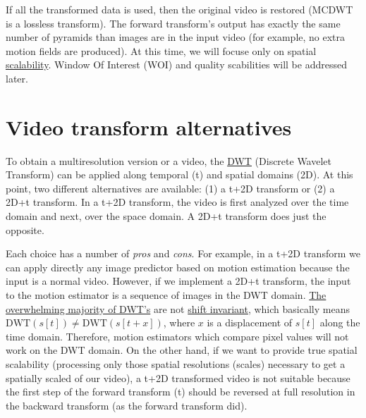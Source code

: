 If all the transformed data is used, then the original video is
restored (MCDWT is a lossless transform). The forward transform's
output has exactly the same number of pyramids than images are in the
input video (for example, no extra motion fields are produced). At
this time, we will focuse only on spatial
\href{http://inst.eecs.berkeley.edu/~ee290t/sp04/lectures/videowavelet_UCB1-3.pdf}{scalability}. Window Of Interest (WOI) and quality scabilities will be addressed later.

\section{Video transform alternatives}
To obtain a multiresolution version or a video, the
\href{https://en.wikipedia.org/wiki/Discrete_wavelet_transform}{DWT}
(Discrete Wavelet Transform) can be applied along temporal (t) and
spatial domains (2D). At this point, two different alternatives are
available: (1) a t+2D transform or (2) a 2D+t transform. In a t+2D
transform, the video is first analyzed over the time domain and next,
over the space domain. A 2D+t transform does just the opposite.

Each choice has a number of \emph{pros} and \emph{cons}. For example, in
a t+2D transform we can apply directly any image predictor based on
motion estimation because the input is a normal video. However, if we
implement a 2D+t transform, the input to the motion estimator is a
sequence of images in the DWT domain.
\href{http://www.polyvalens.com/blog/wavelets/theory}{The overwhelming
majority of DWT's} are not
\href{http://www.polyvalens.com/blog/wavelets/theory}{shift invariant},
which basically means $\text{DWT}(s[t]) \neq \text{DWT}(s[t+x])$,
where $x$ is a displacement of $s[t]$ along the time domain.
Therefore, motion estimators which compare pixel values will not work on
the DWT domain. On the other hand, if we want to provide true spatial
scalability (processing only those spatial resolutions (scales)
necessary to get a spatially scaled of our video), a t+2D transformed
video is not suitable because the first step of the forward transform
(t) should be reversed at full resolution in the backward transform (as
the forward transform did).

